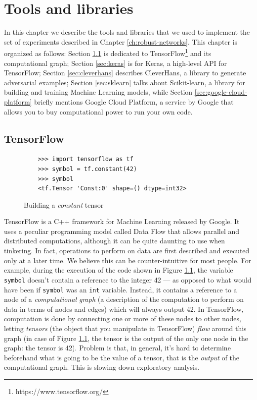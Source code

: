 \chapter{Tools and libraries}
\label{ch:tools-and-libraries}

In this chapter we describe the tools and libraries that we used to
implement the set of experiments described in Chapter
\ref{ch:robust-networks}. This chapter is organized as follows: Section
\ref{sec:tensorflow} is dedicated to
TensorFlow\footnote{https://www.tensorflow.org/} and its computational
graph; Section \ref{sec:keras} is for Keras, a high-level API for
TensorFlow; Section \ref{sec:cleverhans} describes CleverHans, a
library to generate adversarial examples; Section \ref{sec:sklearn}
talks about Scikit-learn, a library for building and training Machine
Learning models, while Section \ref{sec:google-cloud-platform} briefly
mentions Google Cloud Platform, a service by Google that allows you to
buy computational power to run your own code.

\section{TensorFlow}
\label{sec:tensorflow}

\begin{figure}
  \begin{verbatim}
    >>> import tensorflow as tf
    >>> symbol = tf.constant(42)
    >>> symbol
    <tf.Tensor 'Const:0' shape=() dtype=int32>
  \end{verbatim}
  \caption{Building a \emph{constant} tensor}
  \label{fig:fortytwo}
\end{figure}

TensorFlow is a C++ framework for Machine Learning released by Google.
It uses a peculiar programming model called Data Flow that allows
parallel and distributed computations, although it can be quite
daunting to use when tinkering. In fact, operations to perform on data
are first described and executed only at a later time. We believe this
can be counter-intuitive for most people. For example, during the
execution of the code shown in Figure \ref{fig:fortytwo}, the variable
\texttt{symbol} doesn't contain a reference to the integer 42 --- as
opposed to what would have been if \texttt{symbol} was an \texttt{int}
variable. Instead, it contains a reference to a node of a
\emph{computational graph} (a description of the computation to perform
on data in terms of nodes and edges) which will always output 42. In
TensorFlow, computation is done by connecting one or more of these nodes
to other nodes, letting \emph{tensors} (the object that you manipulate
in TensorFlow) \emph{flow} around this
graph (in case of Figure \ref{fig:fortytwo}, the tensor is the output
of the only one node in the graph: the tensor is 42). Problem is that,
in general, it's hard to
determine beforehand what is going to be the value of a tensor, that is the
\emph{output} of the computational graph. This is slowing down
exploratory analysis.


